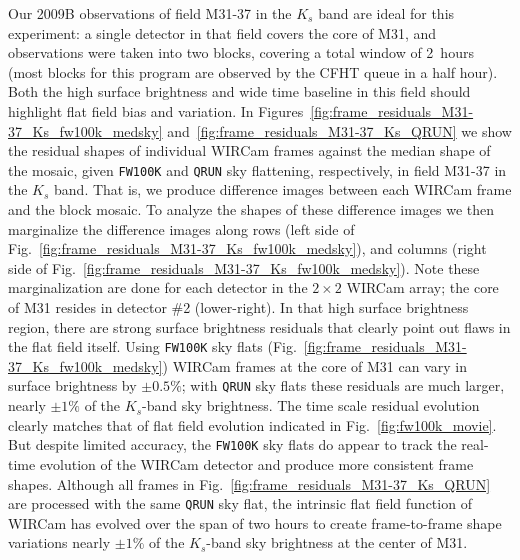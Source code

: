 \documentclass[iop]{emulateapj}
\newcommand{\Fig}[1]{Fig.~\ref{fig:#1}}  %
\begin{document}
Our 2009B observations of field M31-37 in the $K_s$ band are ideal for this experiment: a single detector in that field covers the core of M31, and observations were taken into two blocks, covering a total window of 2~hours (most blocks for this program are observed by the CFHT queue in a half hour).
Both the high surface brightness and wide time baseline in this field should highlight flat field bias and variation.
In Figures~\ref{fig:frame_residuals_M31-37_Ks_fw100k_medsky} and~\ref{fig:frame_residuals_M31-37_Ks_QRUN} we show the residual shapes of individual WIRCam frames against the median shape of the mosaic, given \texttt{FW100K} and \texttt{QRUN} sky flattening, respectively, in field M31-37 in the $K_s$ band.
That is, we produce difference images between each WIRCam frame and the block mosaic.
To analyze the shapes of these difference images we then marginalize the difference images along rows (left side of \Fig{frame_residuals_M31-37_Ks_fw100k_medsky}), and columns (right side of \Fig{frame_residuals_M31-37_Ks_fw100k_medsky}).
Note these marginalization are done for each detector in the $2\times2$ WIRCam array; the core of M31 resides in detector \#2 (lower-right).
In that high surface brightness region, there are strong surface brightness residuals that clearly point out flaws in the flat field itself.
Using \texttt{FW100K} sky flats (\Fig{frame_residuals_M31-37_Ks_fw100k_medsky}) WIRCam frames at the core of M31 can vary in surface brightness by $\pm 0.5\%$; with \texttt{QRUN} sky flats these residuals are much larger, nearly $\pm 1\%$ of the $K_s$-band sky brightness.
The time scale residual evolution clearly matches that of flat field evolution indicated in \Fig{fw100k_movie}.
But despite limited accuracy, the \texttt{FW100K} sky flats do appear to track the real-time evolution of the WIRCam detector and produce more consistent frame shapes.
Although all frames in \Fig{frame_residuals_M31-37_Ks_QRUN} are processed with the same \texttt{QRUN} sky flat, the intrinsic flat field function of WIRCam has evolved over the span of two hours to create frame-to-frame shape variations nearly $\pm 1\%$ of the $K_s$-band sky brightness at the center of M31.
\end{document}
